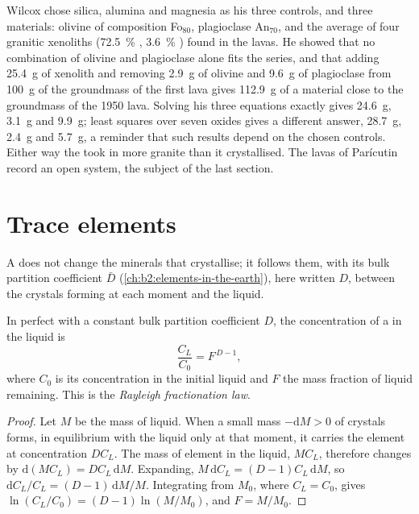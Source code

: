 Wilcox chose silica, alumina and magnesia as his three controls, and three
materials: olivine of composition Fo$_{80}$, plagioclase An$_{70}$, and the average
of four granitic xenoliths (\qty{72.5}{\percent} , \qty{3.6}{\percent}
) found in the lavas. He showed that no combination of olivine and
plagioclase alone fits the series, and that adding \qty{25.4}{g} of xenolith and
removing \qty{2.9}{g} of olivine and \qty{9.6}{g} of plagioclase from
\qty{100}{g} of the groundmass of the first lava gives \qty{112.9}{g} of a material
close to the groundmass of the 1950 lava. Solving his three equations exactly
gives \qty{24.6}{g}, \qty{3.1}{g} and \qty{9.9}{g}; least squares over seven oxides
gives a different answer, \qty{28.7}{g}, \qty{2.4}{g} and \qty{5.7}{g}, a reminder
that such results depend on the chosen controls. Either way the  took in more
granite than it crystallised. The lavas of Parícutin record an open system, the
subject of the last section.

\section{Trace elements}\label{sec:b2:magmatic-differentiation:trace}

A  does not change the minerals that crystallise; it follows them,
with its bulk partition coefficient $\bar D$ (\cref{ch:b2:elements-in-the-earth}),
here written $D$, between the crystals forming at each moment and the liquid.

\begin{theorem}\label{thm:b2:magmatic-differentiation:rayleigh}
In perfect  with a constant bulk partition coefficient
$D$, the concentration of a  in the liquid is
\[
\frac{C_L}{C_0} = F^{\,D-1},
\]
where $C_0$ is its concentration in the initial liquid and $F$ the mass fraction of
liquid remaining. This is the \emph{Rayleigh fractionation law}.
\end{theorem}

\begin{proof}
Let $M$ be the mass of liquid. When a small mass $-\mathrm dM > 0$ of crystals
forms, in equilibrium with the liquid only at that moment, it carries the element at
concentration $DC_L$. The mass of element in the liquid, $MC_L$, therefore changes
by $\mathrm d(MC_L) = DC_L\,\mathrm dM$. Expanding, $M\,\mathrm dC_L = (D-1)C_L\,
\mathrm dM$, so $\mathrm dC_L/C_L = (D-1)\,\mathrm dM/M$. Integrating from $M_0$,
where $C_L = C_0$, gives $\ln(C_L/C_0) = (D-1)\ln(M/M_0)$, and $F = M/M_0$.
\end{proof}

